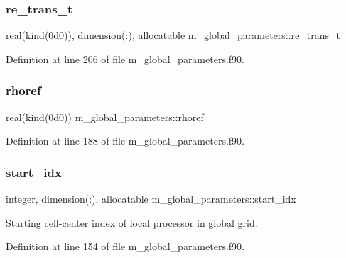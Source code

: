 \subsubsection{\texorpdfstring{re\+\_\+trans\+\_\+t}{re\_trans\_t}}
{\footnotesize\ttfamily real(kind(0d0)), dimension(\+:), allocatable m\+\_\+global\+\_\+parameters\+::re\+\_\+trans\+\_\+t}



Definition at line 206 of file m\+\_\+global\+\_\+parameters.\+f90.

\mbox{\label{namespacem__global__parameters_a485a360d73013d7bce1daa01df404534}} 
\subsubsection{\texorpdfstring{rhoref}{rhoref}}
{\footnotesize\ttfamily real(kind(0d0)) m\+\_\+global\+\_\+parameters\+::rhoref}



Definition at line 188 of file m\+\_\+global\+\_\+parameters.\+f90.

\mbox{\label{namespacem__global__parameters_a4bd117ae744eab60f3d681fd03d6e90d}} 
\subsubsection{\texorpdfstring{start\+\_\+idx}{start\_idx}}
{\footnotesize\ttfamily integer, dimension(\+:), allocatable m\+\_\+global\+\_\+parameters\+::start\+\_\+idx}



Starting cell-\/center index of local processor in global grid. 



Definition at line 154 of file m\+\_\+global\+\_\+parameters.\+f90.

\mbox{\label{namespacem__global__parameters_a95a3647227ae84b17613caee22408853}} 
